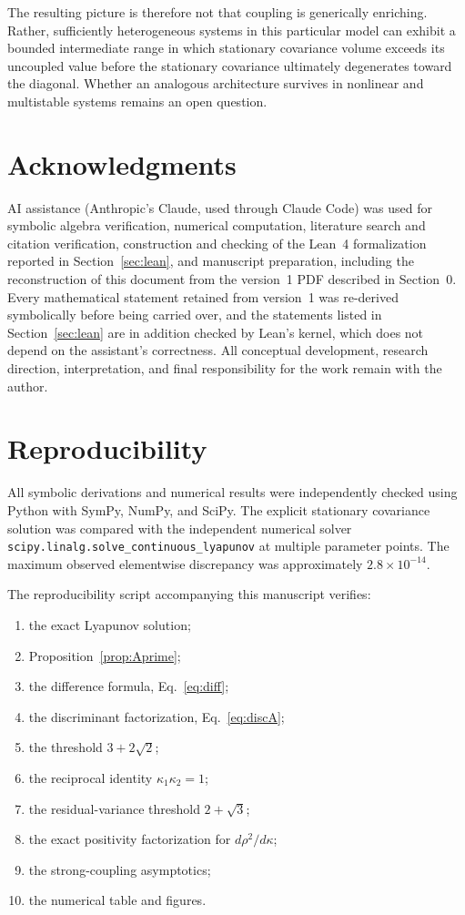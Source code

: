 \documentclass[11pt]{article}
\theoremstyle{plain}
\theoremstyle{remark}
\begin{document}
The resulting picture is therefore not that coupling is generically enriching. Rather,
sufficiently heterogeneous systems in this particular model can exhibit a bounded intermediate
range in which stationary covariance volume exceeds its uncoupled value before the stationary
covariance ultimately degenerates toward the diagonal. Whether an analogous architecture
survives in nonlinear and multistable systems remains an open question.

\section*{Acknowledgments}

AI assistance (Anthropic's Claude, used through Claude Code) was used for symbolic algebra
verification, numerical computation, literature search and citation verification, construction
and checking of the Lean~4 formalization reported in Section~\ref{sec:lean}, and manuscript
preparation, including the reconstruction of this document from the version~1 PDF described in
Section~0. Every mathematical statement retained from version~1 was re-derived symbolically
before being carried over, and the statements listed in Section~\ref{sec:lean} are in addition
checked by Lean's kernel, which does not depend on the assistant's correctness. All conceptual
development, research direction, interpretation, and final responsibility for the work remain
with the author.

\appendix

\section{Reproducibility}

All symbolic derivations and numerical results were independently checked using Python with
SymPy, NumPy, and SciPy. The explicit stationary covariance solution was compared with the
independent numerical solver \texttt{scipy.linalg.solve\_continuous\_lyapunov} at multiple
parameter points. The maximum observed elementwise discrepancy was approximately
$2.8\times10^{-14}$.

The reproducibility script accompanying this manuscript verifies:
\begin{enumerate}\itemsep1pt
\item the exact Lyapunov solution;
\item Proposition~\ref{prop:Aprime};
\item the difference formula, Eq.~\eqref{eq:diff};
\item the discriminant factorization, Eq.~\eqref{eq:discA};
\item the threshold $3+2\sqrt2$;
\item the reciprocal identity $\kappa_1\kappa_2=1$;
\item the residual-variance threshold $2+\sqrt3$;
\item the exact positivity factorization for $d\rho^2/d\kappa$;
\item the strong-coupling asymptotics;
\item the numerical table and figures.
\end{enumerate}
\end{document}
